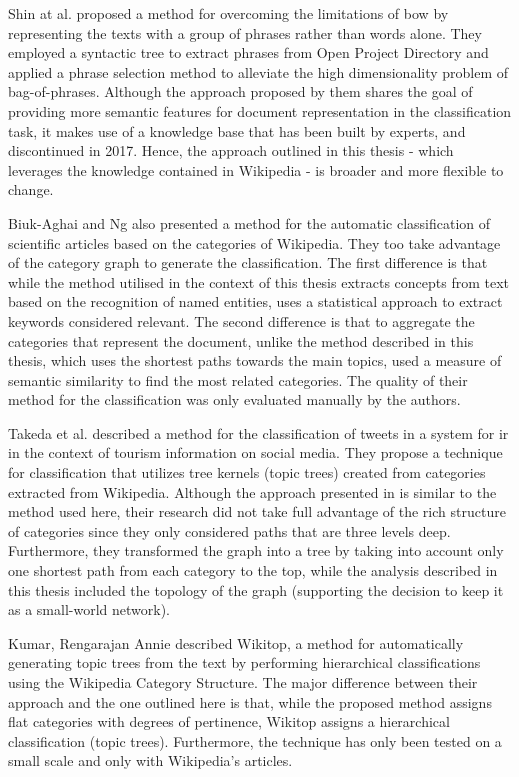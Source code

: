 Shin at al. \cite{7062484} proposed a method for overcoming the limitations of \gls{bow} by representing the texts with a group of phrases rather than words alone. They employed a syntactic tree to extract phrases from Open Project Directory and applied a phrase selection method to alleviate the high dimensionality problem of bag-of-phrases. Although the approach proposed by them shares the goal of providing more semantic features for document representation in the classification task, it makes use of a knowledge base that has been built by experts, and discontinued in 2017. Hence, the approach outlined in this thesis - which leverages the knowledge contained in Wikipedia - is broader and more flexible to change. 


Biuk-Aghai and Ng \cite {7062484} also presented a method for the automatic classification of scientific articles based on the categories of Wikipedia. They too take advantage of the category graph to generate the classification. The first difference is that while the method utilised in the context of this thesis extracts concepts from text based on the recognition of named entities, \cite {7062484} uses a statistical approach to extract keywords considered relevant. The second difference is that to aggregate the categories that represent the document, unlike the method described in this thesis, which uses the shortest paths towards the main topics, \cite {7062484} used a measure of semantic similarity to find the most related categories. The quality of their method for the classification was only evaluated manually by the authors.

Takeda et al. \cite{takeda2016classification} described a method for the classification of tweets in a system for \gls{ir} in the context of tourism information on social media. They propose a technique for classification that utilizes tree kernels (topic trees) created from categories extracted from  Wikipedia. Although the approach presented in \cite{takeda2016classification} is similar to the method used here, their research did not take full advantage of the rich structure of categories since they only considered paths that are three levels deep. Furthermore, they transformed the graph into a tree by taking into account only one shortest path from each category to the top, while the analysis described in this thesis included the topology of the graph (supporting the decision to keep it as a small-world network). 

Kumar, Rengarajan Annie \cite{kumar2017wikitop} described Wikitop, a method for automatically generating topic trees from the text by performing hierarchical classifications using the Wikipedia Category Structure. The major difference between their approach and the one outlined here is that, while the proposed method assigns flat categories with degrees of pertinence, Wikitop assigns a hierarchical classification (topic trees). Furthermore, the technique has only been tested on a small scale and only with Wikipedia's articles.


